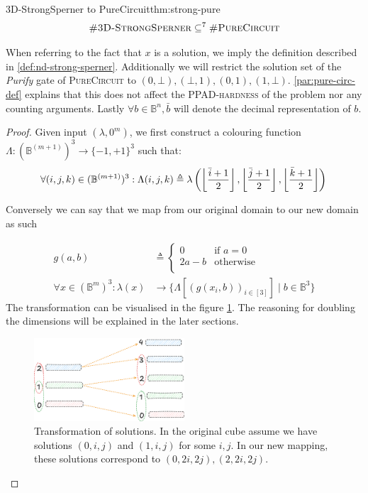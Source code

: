 \begin{theorembox}{3D-StrongSperner to PureCircuit}{thm:strong-pure}
    $$
    \textnormal{\textsc{\#3D-StrongSperner}} \subseteq^{7} \textnormal{\textsc{\#PureCircuit}}
    $$
\end{theorembox}

When referring to the fact that $x$ is a solution, we imply the definition described in  \ref{def:nd-strong-sperner}.
Additionally we will restrict the solution set of the \textit{Purify} gate of \textsc{PureCircuit}
to $(0,\bot),(\bot, 1), (0,1), (1, \bot)$. \ref{par:pure-circ-def} explains that this
does not affect the \textsc{PPAD-hardness} of the problem nor any counting arguments.
Lastly $\forall b \in \mathbb{B}^n, \bar{b}$ will denote the decimal representation of $b$.

\begin{proof} 
    Given input $(\lambda, 0^m)$, we first construct a colouring function $\Lambda: (\mathbb{B}^{(m+1)})^3 \to \{-1,+1\}^3$ such that:
$$
\forall (i,j,k) \in (\mathbb{B}^{(m+1)})^3: \Lambda(i,j,k) \triangleq 
\lambda\left( \left\lfloor  \frac{{\bar{i}+1}}{2}  \right\rfloor, \left\lfloor  \frac{{\bar{j}+1}}{2} \right\rfloor, \left\lfloor  \frac{{\bar{k}+1}}{2} \right\rfloor \right)  \\
$$

Conversely we can say that we map from our original domain to our new domain as such

\begin{align}
    g(a, b) &\triangleq \begin{cases}
        0 &\text{if } a = 0 \\
        2a - b &\text{otherwise}\\
    \end{cases} \\
        \forall  x \in (\mathbb{B}^{m})^3: \lambda(x) &\to \{\Lambda[(g(x_i,b))_{i \in [3]}] \mid b \in \mathbb{B}^{3}\}
\label{eq:trans-eq}
\end{align}
The transformation can be visualised in the figure \ref{fig:main-proof:set_mapping}.
The reasoning for doubling the dimensions will be explained in the later sections.

\begin{figure}[h!]
    \centering
    \includegraphics[width=0.5\textwidth]{assets/1751381227.png}
\caption{Transformation of solutions. In the original cube assume we have solutions $(0,i,j)$ and $(1,i,j)$ for some $i,j$. In our new mapping, these solutions correspond to
$(0,2i,2j), (2,2i,2j)$.}
    \label{fig:main-proof:set_mapping}
\end{figure}


\end{proof}
